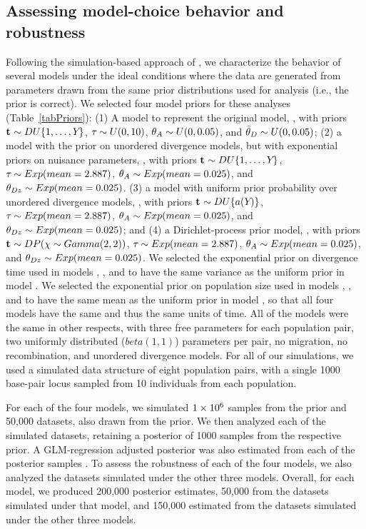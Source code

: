 \subsection*{Assessing model-choice behavior and robustness}
Following the simulation-based approach of \citet{Oaks2012}, we characterize
the behavior of several models under the ideal conditions where the
data are generated from parameters drawn from the same prior distributions used
for analysis (i.e., the prior is correct).
We selected four model priors for these analyses (Table~\ref{tabPriors}):
(1) A model to represent the original \msb model, \modelOld, with
priors
$\mathbf{t_{}} \sim DU\{1, \ldots, Y_{}\}$,
$\tau_{} \sim U(0,10)$,
$\ancestralTheta{} \sim U(0, 0.05)$,
and
$\descendantThetaMean{} \sim U(0, 0.05)$;
(2) a model with the \msb prior on unordered divergence models, but with
exponential priors on nuisance parameters,
\modelUshaped, with priors
$\mathbf{t_{}} \sim DU\{1, \ldots, Y_{}\}$,
$\tau_{} \sim Exp(mean=2.887)$,
$\ancestralTheta{} \sim Exp(mean=0.025)$,
and
$\dThetas \sim Exp(mean=0.025)$.
(3) a model with uniform prior probability over unordered divergence models,
\modelUniform, with priors
$\mathbf{t_{}} \sim DU\{a({Y_{}})\}$,
$\tau_{} \sim Exp(mean=2.887)$,
$\ancestralTheta{} \sim Exp(mean=0.025)$,
and
$\dThetas \sim Exp(mean=0.025)$;
and
(4) a Dirichlet-process prior model, \modelDPP, with priors
$\mathbf{t_{}} \sim DP(\chi \sim Gamma(2,2))$,
$\tau_{} \sim Exp(mean=2.887)$,
$\ancestralTheta{} \sim Exp(mean=0.025)$,
and
$\dThetas \sim Exp(mean=0.025)$.
We selected the exponential prior on divergence time used in models \modelDPP,
\modelUniform, and \modelUshaped to have the same variance as the uniform prior
in model \modelOld.
We selected the exponential prior on population size used in models \modelDPP,
\modelUniform, and \modelUniform to have the same mean as the uniform prior in
model \modelOld, so that all four models have the same  and thus the
same units of time.
All of the models were the same in other respects, with three free \myTheta{}
parameters for each population pair, two uniformly distributed ($beta(1,1)$)
\bottleScalar{}{} parameters per pair, no migration, no recombination,
and unordered divergence models.
For all of our simulations, we used a simulated data structure of eight
population pairs, with a single 1000 base-pair locus sampled from 10
individuals from each population.

For each of the four models, we simulated $1\times 10^{6}$ samples from the prior and
50,000 datasets, also drawn from the prior.
We then analyzed each of the simulated datasets, retaining a
posterior of 1000 samples from the respective prior.
A GLM-regression adjusted posterior was also estimated from each of the
posterior samples \citep{Leuenberger2010}.
To assess the robustness of each of the four models, we also analyzed the
datasets simulated under the other three models.
Overall, for each model, we produced 200,000 posterior estimates,
50,000 from the datasets simulated under that model,
and 150,000 estimated from the datasets simulated under the
other three models.

